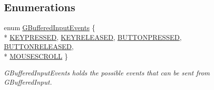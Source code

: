 \subsection*{Enumerations}
\begin{DoxyCompactItemize}
\item 
enum \hyperlink{namespaceGW_1_1SYSTEM_a309fd3a92512dd2bfa8065d99c0d7fcb}{G\+Buffered\+Input\+Events} \{ \\*
\hyperlink{namespaceGW_1_1SYSTEM_a309fd3a92512dd2bfa8065d99c0d7fcbaf8bb58b0791c2d5d33b224213327f960}{K\+E\+Y\+P\+R\+E\+S\+S\+ED}, 
\hyperlink{namespaceGW_1_1SYSTEM_a309fd3a92512dd2bfa8065d99c0d7fcbabb708a216e7e8ef33cc542e6def7a688}{K\+E\+Y\+R\+E\+L\+E\+A\+S\+ED}, 
\hyperlink{namespaceGW_1_1SYSTEM_a309fd3a92512dd2bfa8065d99c0d7fcba56314f1a5b4d09751ed354a45a3a78fb}{B\+U\+T\+T\+O\+N\+P\+R\+E\+S\+S\+ED}, 
\hyperlink{namespaceGW_1_1SYSTEM_a309fd3a92512dd2bfa8065d99c0d7fcba9f7d6e613de276b27e471cd30eac08de}{B\+U\+T\+T\+O\+N\+R\+E\+L\+E\+A\+S\+ED}, 
\\*
\hyperlink{namespaceGW_1_1SYSTEM_a309fd3a92512dd2bfa8065d99c0d7fcbae4066728a571d6456cf5def5742a92bf}{M\+O\+U\+S\+E\+S\+C\+R\+O\+LL}
 \}\begin{DoxyCompactList}\small\item\em G\+Buffered\+Input\+Events holds the possible events that can be sent from G\+Buffered\+Input. \end{DoxyCompactList}
\end{DoxyCompactItemize}
